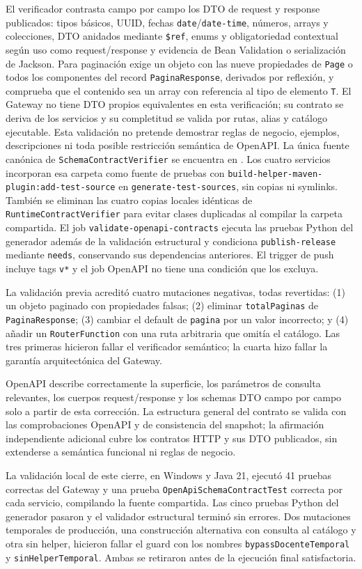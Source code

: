El verificador contrasta campo por campo los DTO de request y response
publicados: tipos básicos, UUID, fechas \texttt{date}/\texttt{date-time},
números, arrays y colecciones, DTO anidados mediante \texttt{\$ref}, enums y
obligatoriedad contextual según uso como request/response y evidencia de Bean
Validation o serialización de Jackson. Para paginación exige un objeto con las
nueve propiedades de \texttt{Page} o todos los componentes del record
\texttt{PaginaResponse}, derivados por reflexión, y comprueba que el contenido
sea un array con referencia al tipo de elemento \texttt{T}. El Gateway no tiene
DTO propios equivalentes en esta verificación; su contrato se deriva de los
servicios y su completitud se valida por rutas, alias y catálogo ejecutable.
Esta validación no pretende demostrar reglas de negocio, ejemplos,
descripciones ni toda posible restricción semántica de OpenAPI. La única fuente canónica de \texttt{SchemaContractVerifier} se encuentra en
.
Los cuatro servicios incorporan esa carpeta como fuente de pruebas con
\texttt{build-helper-maven-plugin:add-test-source} en
\texttt{generate-test-sources}, sin copias ni symlinks. También se eliminan las
cuatro copias locales idénticas de \texttt{RuntimeContractVerifier} para evitar
clases duplicadas al compilar la carpeta compartida.
El job \texttt{validate-openapi-contracts} ejecuta las pruebas Python del
generador además de la validación estructural y condiciona
\texttt{publish-release} mediante \texttt{needs}, conservando sus dependencias
anteriores. El trigger de push incluye tags \texttt{v*} y el job OpenAPI no
tiene una condición que los excluya.

La validación previa acreditó cuatro mutaciones negativas, todas revertidas:
(1) un objeto paginado con propiedades falsas; (2) eliminar
\texttt{totalPaginas} de \texttt{PaginaResponse}; (3) cambiar el default de
\texttt{pagina} por un valor incorrecto; y (4) añadir un
\texttt{RouterFunction} con una ruta arbitraria que omitía el catálogo.
Las tres primeras hicieron fallar el verificador semántico; la cuarta hizo
fallar la garantía arquitectónica del Gateway.

OpenAPI describe correctamente la superficie, los parámetros de consulta
relevantes, los cuerpos request/response y los schemas DTO campo por campo solo
a partir de esta corrección. La estructura general del contrato se valida con
las comprobaciones OpenAPI y de consistencia del snapshot; la afirmación
independiente adicional cubre los contratos HTTP y sus DTO publicados, sin
extenderse a semántica funcional ni reglas de negocio.

La validación local de este cierre, en Windows y Java 21, ejecutó 41 pruebas
correctas del Gateway y una prueba \texttt{OpenApiSchemaContractTest} correcta
por cada servicio, compilando la fuente compartida. Las cinco pruebas Python
del generador pasaron y el validador estructural terminó sin errores.
Dos mutaciones temporales de producción, una construcción alternativa con
consulta al catálogo y otra sin helper, hicieron fallar el guard con los
nombres \texttt{bypassDocenteTemporal} y \texttt{sinHelperTemporal}.
Ambas se retiraron antes de la ejecución final satisfactoria.
